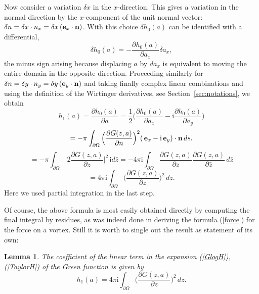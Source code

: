 \documentclass[reqno,12pt]{article}
\theoremstyle{plain}
\newtheorem{lemma}[thm]{Lemma}
\theoremstyle{definition}
\numberwithin{equation}{section}
\numberwithin{figure}{section}
\def\I{\mathrm{i}}
\begin{document}
Now consider a variation $\delta x$ in the $x$-direction.
This gives a variation in the normal direction by the $x$-component of the unit normal vector:
$\delta n=\delta x \cdot n_x=\delta x \,({\bf e}_x\cdot {\bf n})$.
With this choice $\delta h_0(a)$ can be identified with a differential,
$$
\delta h_0(a)=-\frac{\partial h_0(a)}{\partial {a_x}}\delta a_x,
$$
the minus sign arising because displacing $a$ by $da_x$ is equivalent to moving the entire domain
in the opposite direction. Proceeding similarly for $\delta n=\delta y \cdot n_y=\delta y \,({\bf e}_y\cdot {\bf n})$ 
and taking finally complex linear combinations and using the definition of the 
Wirtinger derivatives, see Section~\ref{sec:notations}, we obtain
\begin{equation*} 
h_1(a)=\frac{\partial h_0(a)}{\partial {a}}
=\frac{1}{2}\big(\frac{\partial h_0(a)}{\partial {a_x}}-\I \frac{\partial h_0(a)}{\partial {a_y}}\big)
\end{equation*}
\begin{equation*}
=-\pi \int_{\partial \Omega}\Big(\frac{\partial G(z,a)}{\partial n}\Big)^2(\, {\bf e}_x-\I \,{\bf e}_y)\cdot {\bf n} \,ds.
\end{equation*}
\begin{equation*}
=-\pi \int_{\partial \Omega}\Big|2\frac{\partial G(z,a)}{\partial z}\Big|^2\,\I d\bar{z} 
=-4\pi \I\int_{\partial \Omega}\frac{\partial G(z,a)}{\partial z}\frac{\partial G(z,a)}{\partial \bar{z}}\, d\bar{z}
\end{equation*}
$$
=4\pi\I \int_{\partial \Omega}\Big(\frac{\partial G(z,a)}{\partial z}\Big)^2\, d{z}.
$$
Here we used partial integration in the last step.

Of course, the above formula is most easily obtained directly by computing the final integral by residues, as was indeed done
in deriving the formula (\ref{force}) for the force on a vortex. Still it is worth to single out the result as statement of its own:
\begin{lemma}
The coefficient of the linear term in the expansion (\ref{GlogH}), (\ref{TaylorH}) of the Green function is given by
\begin{equation}
h_1(a)=4\pi\I \int_{\partial \Omega}\Big(\frac{\partial G(z,a)}{\partial z}\Big)^2\, d{z}.
\end{equation}
\end{lemma} 
\end{document}
